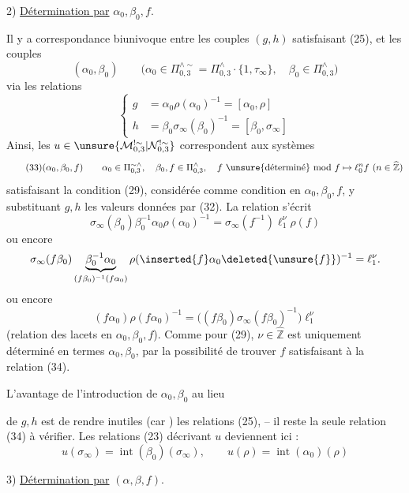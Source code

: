 
2) \uline{Détermination par} $\alpha_0,\beta_0,f$.

Il y a correspondance biunivoque entre les couples $(g,h)$ satisfaisant (25), et les couples
\[
\tag{31}
(\alpha_0,\beta_0)\qquad
\bigl(\alpha_0\in\Pi_{0,3}^{\wedge\sim}=\Pi_{0,3}^{\wedge}\cdot\{1,\tau_\infty\},\quad
\beta_0\in\Pi_{0,3}^{\wedge}\bigr)
\]
 via les relations
\[
\tag{32}
\left\{\begin{aligned}
g&=\alpha_0\rho(\alpha_0)^{-1}=[\alpha_0,\rho]\\
h&=\beta_0\sigma_\infty(\beta_0)^{-1}=[\beta_0,\sigma_\infty]
\end{aligned}\right.
\]
Ainsi, les $u\in\unsure{\mathcal{M}_{0,3}^{!\sim}|\mathcal{N}_{0,3}^{!\sim}}$ correspondent aux systèmes
\[
\tag{33}
(\alpha_0,\beta_0,f)\qquad
\alpha_0\in\Pi_{0,3}^{\sim\wedge},\quad\beta_0,f\in\Pi_{0,3}^{\wedge},\quad
f\ \text{\unsure{déterminé} mod }f\mapsto\ell_0^n f\ (n\in\widehat{\mathbb Z})
\]
satisfaisant la condition  (29), considérée comme condition en $\alpha_0,\beta_0,f$,  y substituant  $g,h$ les valeurs données par (32). La relation s'écrit
\[
\sigma_\infty(\beta_0)\beta_0^{-1}\alpha_0\rho(\alpha_0)^{-1}
=\sigma_\infty(f^{-1})\ell_1^\nu\rho(f)
\]
ou encore
\[
\sigma_\infty(f\beta_0)
\underbrace{\beta_0^{-1}\alpha_0}_{(f\beta_0)^{-1}(f\alpha_0)}
\rho(\inserted{f}\alpha_0\deleted{\unsure{f}})^{-1}
=\ell_1^\nu.
\]
ou encore
\[
\tag{34}
\boxed{(f\alpha_0)\rho(f\alpha_0)^{-1}
=\bigl((f\beta_0)\sigma_\infty(f\beta_0)^{-1}\bigr)\ell_1^\nu}
\]
(relation des lacets en $\alpha_0,\beta_0,f$). Comme pour (29), $\nu\in\widehat{\mathbb Z}$ est uniquement déterminé en termes  $\alpha_0,\beta_0$, par la possibilité de trouver $f$ satisfaisant à la relation (34).

L'avantage de l'introduction de $\alpha_0,\beta_0$ au lieu


de $g,h$ est de rendre inutiles (car ) les relations (25), -- il reste la seule relation (34) à vérifier. Les relations (23) décrivant $u$ deviennent ici :
\[
\tag{35}
u(\sigma_\infty)=\operatorname{int}(\beta_0)(\sigma_\infty),\qquad
u(\rho)=\operatorname{int}(\alpha_0)(\rho)
\]

3) \uline{Détermination par} $(\alpha,\beta,f)$.

